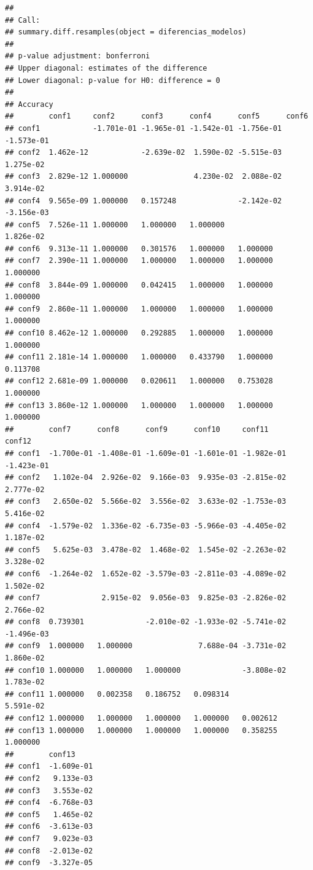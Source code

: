 \documentclass[
]{article}
\begin{document}
\begin{verbatim}
## 
## Call:
## summary.diff.resamples(object = diferencias_modelos)
## 
## p-value adjustment: bonferroni 
## Upper diagonal: estimates of the difference
## Lower diagonal: p-value for H0: difference = 0
## 
## Accuracy 
##        conf1     conf2      conf3      conf4      conf5      conf6     
## conf1            -1.701e-01 -1.965e-01 -1.542e-01 -1.756e-01 -1.573e-01
## conf2  1.462e-12            -2.639e-02  1.590e-02 -5.515e-03  1.275e-02
## conf3  2.829e-12 1.000000               4.230e-02  2.088e-02  3.914e-02
## conf4  9.565e-09 1.000000   0.157248              -2.142e-02 -3.156e-03
## conf5  7.526e-11 1.000000   1.000000   1.000000               1.826e-02
## conf6  9.313e-11 1.000000   0.301576   1.000000   1.000000             
## conf7  2.390e-11 1.000000   1.000000   1.000000   1.000000   1.000000  
## conf8  3.844e-09 1.000000   0.042415   1.000000   1.000000   1.000000  
## conf9  2.860e-11 1.000000   1.000000   1.000000   1.000000   1.000000  
## conf10 8.462e-12 1.000000   0.292885   1.000000   1.000000   1.000000  
## conf11 2.181e-14 1.000000   1.000000   0.433790   1.000000   0.113708  
## conf12 2.681e-09 1.000000   0.020611   1.000000   0.753028   1.000000  
## conf13 3.860e-12 1.000000   1.000000   1.000000   1.000000   1.000000  
##        conf7      conf8      conf9      conf10     conf11     conf12    
## conf1  -1.700e-01 -1.408e-01 -1.609e-01 -1.601e-01 -1.982e-01 -1.423e-01
## conf2   1.102e-04  2.926e-02  9.166e-03  9.935e-03 -2.815e-02  2.777e-02
## conf3   2.650e-02  5.566e-02  3.556e-02  3.633e-02 -1.753e-03  5.416e-02
## conf4  -1.579e-02  1.336e-02 -6.735e-03 -5.966e-03 -4.405e-02  1.187e-02
## conf5   5.625e-03  3.478e-02  1.468e-02  1.545e-02 -2.263e-02  3.328e-02
## conf6  -1.264e-02  1.652e-02 -3.579e-03 -2.811e-03 -4.089e-02  1.502e-02
## conf7              2.915e-02  9.056e-03  9.825e-03 -2.826e-02  2.766e-02
## conf8  0.739301              -2.010e-02 -1.933e-02 -5.741e-02 -1.496e-03
## conf9  1.000000   1.000000               7.688e-04 -3.731e-02  1.860e-02
## conf10 1.000000   1.000000   1.000000              -3.808e-02  1.783e-02
## conf11 1.000000   0.002358   0.186752   0.098314               5.591e-02
## conf12 1.000000   1.000000   1.000000   1.000000   0.002612             
## conf13 1.000000   1.000000   1.000000   1.000000   0.358255   1.000000  
##        conf13    
## conf1  -1.609e-01
## conf2   9.133e-03
## conf3   3.553e-02
## conf4  -6.768e-03
## conf5   1.465e-02
## conf6  -3.613e-03
## conf7   9.023e-03
## conf8  -2.013e-02
## conf9  -3.327e-05

\end{verbatim}
\end{document}
